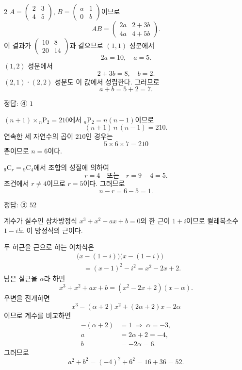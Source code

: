 \documentclass[10pt]{article}
\begin{document}
\begin{multicols}{2}
$A = \begin{pmatrix} 2 & 3 \\ 4 & 5 \end{pmatrix}$, $B = \begin{pmatrix} a & 1 \\ 0 & b \end{pmatrix}$이므로
\[ AB = \begin{pmatrix} 2a & 2 + 3b \\ 4a & 4 + 5b \end{pmatrix}. \]
이 결과가 $\begin{pmatrix} 10 & 8 \\ 20 & 14 \end{pmatrix}$과 같으므로 $(1,1)$ 성분에서
\[ 2a = 10,\quad a = 5. \]
$(1,2)$ 성분에서
\[ 2 + 3b = 8,\quad b = 2. \]
$(2,1)$·$(2,2)$ 성분도 이 값에서 성립한다. 그러므로
\[ a + b = 5 + 2 = 7. \]

\begin{answerbox}정답: ④ $1$\end{answerbox}

$(n+1) \times {}_n\mathrm{P}_2 = 210$에서 ${}_n\mathrm{P}_2 = n(n-1)$이므로
\[ (n+1)\,n\,(n-1) = 210. \]
연속한 세 자연수의 곱이 $210$인 경우는
\[ 5 \times 6 \times 7 = 210 \]
뿐이므로 $n = 6$이다.

${}_9\mathrm{C}_r = {}_9\mathrm{C}_4$에서 조합의 성질에 의하여
\[ r = 4 \quad \text{또는} \quad r = 9 - 4 = 5. \]
조건에서 $r \ne 4$이므로 $r = 5$이다. 그러므로
\[ n - r = 6 - 5 = 1. \]

\begin{answerbox}정답: ③ $52$\end{answerbox}

계수가 실수인 삼차방정식 $x^3 + x^2 + ax + b = 0$의 한 근이 $1 + i$이므로 켤레복소수 $1 - i$도 이 방정식의 근이다.

두 허근을 근으로 하는 이차식은
\begin{align*}
&\bigl(x - (1+i)\bigr)\bigl(x - (1-i)\bigr) \\
&\quad = (x-1)^2 - i^2 = x^2 - 2x + 2.
\end{align*}
남은 실근을 $\alpha$라 하면
\[ x^3 + x^2 + ax + b = (x^2 - 2x + 2)(x - \alpha). \]
우변을 전개하면
\[ x^3 - (\alpha + 2)x^2 + (2\alpha + 2)x - 2\alpha \]
이므로 계수를 비교하면
\begin{align*}
-(\alpha + 2) &= 1 \;\Rightarrow\; \alpha = -3, \\
a &= 2\alpha + 2 = -4, \\
b &= -2\alpha = 6.
\end{align*}
그러므로
\[ a^2 + b^2 = (-4)^2 + 6^2 = 16 + 36 = 52. \]


\end{multicols}
\end{document}
